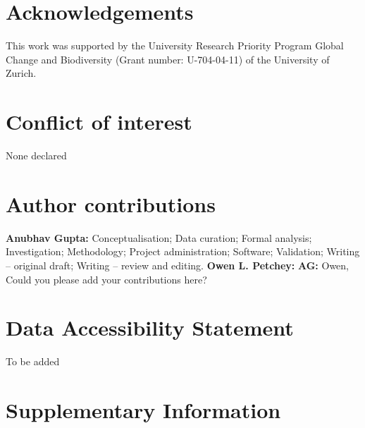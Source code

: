 \documentclass{article}
\begin{document}
\hypertarget{acknowledgements}{%
\section{Acknowledgements}\label{acknowledgements}}

This work was supported by the University Research Priority Program
Global Change and Biodiversity (Grant number: U-704-04-11) of the
University of Zurich.

\hypertarget{conflict-of-interest}{%
\section{Conflict of interest}\label{conflict-of-interest}}

None declared

\hypertarget{author-contributions}{%
\section{Author contributions}\label{author-contributions}}

\textbf{Anubhav Gupta:} Conceptualisation; Data curation; Formal
analysis; Investigation; Methodology; Project administration; Software;
Validation; Writing -- original draft; Writing -- review and editing.
\textbf{Owen L. Petchey:} \textbf{AG:} Owen, Could you please add your
contributions here?

\hypertarget{data-accessibility-statement}{%
\section{Data Accessibility
Statement}\label{data-accessibility-statement}}

To be added

\hypertarget{supplementary-information}{%
\section{Supplementary Information}\label{supplementary-information}}
\end{document}

